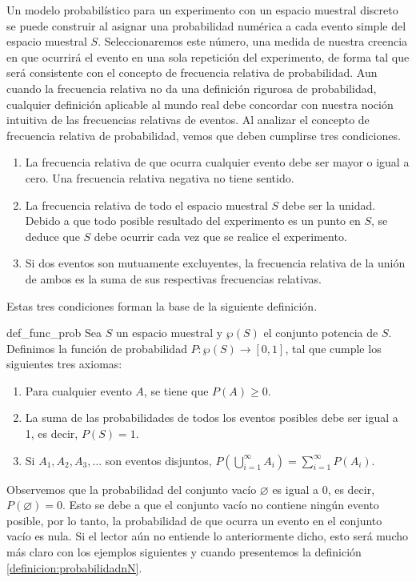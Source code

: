 Un modelo probabilístico para un experimento con un espacio muestral discreto se puede construir al asignar una probabilidad numérica a cada evento simple del espacio muestral $S$. Seleccionaremos este número, una medida de nuestra creencia en que ocurrirá el evento en una sola repetición del experimento, de forma tal que será consistente con el concepto de frecuencia relativa de probabilidad. Aun cuando la frecuencia relativa no da una definición rigurosa de probabilidad, cualquier definición aplicable al mundo real debe concordar con nuestra noción intuitiva de las frecuencias relativas de eventos. Al analizar el concepto de frecuencia relativa de probabilidad, vemos que deben cumplirse tres condiciones.
\begin{enumerate}
    \item La frecuencia relativa de que ocurra cualquier evento debe ser mayor o igual a cero. Una frecuencia relativa negativa no tiene sentido.
    \item La frecuencia relativa de todo el espacio muestral $S$ debe ser la unidad. Debido a que todo posible resultado del experimento es un punto en $S$, se deduce que $S$ debe ocurrir cada vez que se realice el experimento.
    \item Si dos eventos son mutuamente excluyentes, la frecuencia relativa de la unión de ambos es la suma de sus respectivas frecuencias relativas.
\end{enumerate}
Estas tres condiciones forman la base de la siguiente definición.

\begin{definicion}{}{def_func_prob}
    Sea $S$ un espacio muestral y $\wp(S)$ el conjunto potencia de $S$. Definimos la función de probabilidad $P: \wp(S) \longrightarrow [0, 1]$, tal que cumple los siguientes tres axiomas:
    \begin{enumerate}[label=\roman*., topsep=6pt, itemsep=0pt]
        \item Para cualquier evento $A$, se tiene que $P(A) \geq 0$.
        \item La suma de las probabilidades de todos los eventos posibles debe ser igual a 1, es decir, $P(S) = 1$.
        \item Si $A_1, A_2, A_3, \dots$ son eventos disjuntos, $\displaystyle P\left( \bigcup_{i = 1}^{\infty} A_i \right) = \sum_{i = 1}^{\infty} P(A_i)$.
    \end{enumerate}
\end{definicion}

Observemos que la probabilidad del conjunto vacío $\varnothing$ es igual a 0, es decir, $P(\varnothing) = 0$. Esto se debe a que el conjunto vacío no contiene ningún evento posible, por lo tanto, la probabilidad de que ocurra un evento en el conjunto vacío es nula. Si el lector aún no entiende lo anteriormente dicho, esto será mucho más claro con los ejemplos siguientes y cuando presentemos la definición \ref{definicion:probabilidadnN}.

